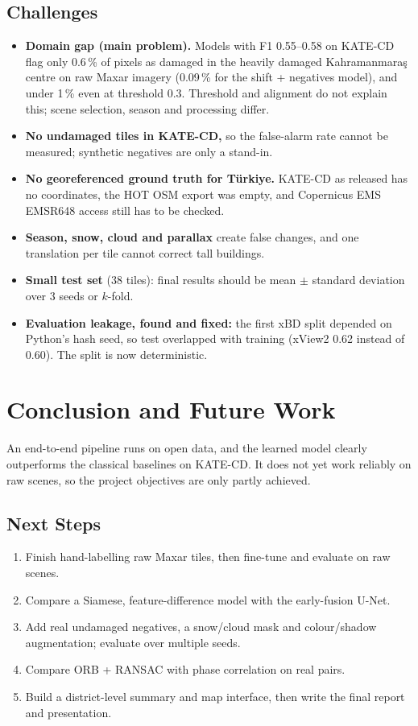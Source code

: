 \documentclass[14pt]{article}
\begin{document}
\subsection{Challenges}
\begin{itemize}
    \item \textbf{Domain gap (main problem).} Models with F1 0.55--0.58 on KATE-CD flag only 0.6\,\% of pixels as damaged in the heavily damaged Kahramanmara\c{s} centre on raw Maxar imagery (0.09\,\% for the shift + negatives model), and under 1\,\% even at threshold 0.3. Threshold and alignment do not explain this; scene selection, season and processing differ.
    \item \textbf{No undamaged tiles in KATE-CD,} so the false-alarm rate cannot be measured; synthetic negatives are only a stand-in.
    \item \textbf{No georeferenced ground truth for T\"urkiye.} KATE-CD as released has no coordinates, the HOT OSM export was empty, and Copernicus EMS EMSR648 access still has to be checked.
    \item \textbf{Season, snow, cloud and parallax} create false changes, and one translation per tile cannot correct tall buildings.
    \item \textbf{Small test set} (38 tiles): final results should be mean $\pm$ standard deviation over 3 seeds or $k$-fold.
    \item \textbf{Evaluation leakage, found and fixed:} the first xBD split depended on Python's hash seed, so test overlapped with training (xView2 0.62 instead of 0.60). The split is now deterministic.
\end{itemize}

\section{Conclusion and Future Work}
An end-to-end pipeline runs on open data, and the learned model clearly outperforms the classical baselines on KATE-CD. It does not yet work reliably on raw scenes, so the project objectives are only partly achieved.

\subsection{Next Steps}
\begin{enumerate}
    \item Finish hand-labelling raw Maxar tiles, then fine-tune and evaluate on raw scenes.
    \item Compare a Siamese, feature-difference model with the early-fusion U-Net.
    \item Add real undamaged negatives, a snow/cloud mask and colour/shadow augmentation; evaluate over multiple seeds.
    \item Compare ORB + RANSAC with phase correlation on real pairs.
    \item Build a district-level summary and map interface, then write the final report and presentation.
\end{enumerate}
\end{document}
